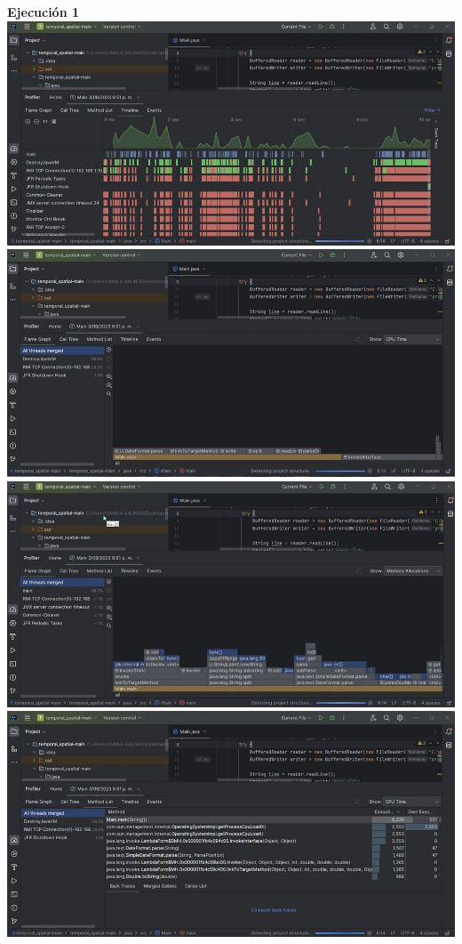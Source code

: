 \documentclass[a4paper,twocolumn,10pt]{article}
\begin{document}
\textbf{Ejecución 1\\}
\includegraphics[width=0.9\linewidth]{Lenovo AMD 3020e/TimeLine 1.jpeg}
\includegraphics[width=0.9\linewidth]{Lenovo AMD 3020e/FlameGraph CPU Time 1.jpeg}
\includegraphics[width=0.9\linewidth]{Lenovo AMD 3020e/FlameGraph Memory Allocation 1.jpeg}
\includegraphics[width=0.9\linewidth]{Lenovo AMD 3020e/Method List CPU Time 1.jpeg}
\end{document}
